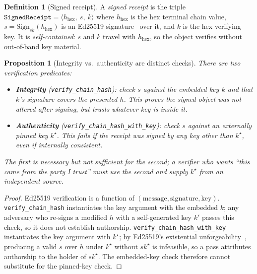 \documentclass[11pt,oneside]{book}
\theoremstyle{definition}
\newtheorem{definition}{Definition}[chapter]
\theoremstyle{plain}
\newtheorem{proposition}[theorem]{Proposition}
\theoremstyle{remark}
\newcommand{\code}[1]{\texttt{#1}}
\begin{document}
\begin{definition}[Signed receipt]\label{def:signed}
A \emph{signed receipt} is the triple
$\code{SignedReceipt}=\langle h_{\mathrm{hex}},\ s,\ k\rangle$ where $h_{\mathrm{hex}}$ is the
hex terminal chain value, $s=\mathrm{Sign}_{sk}(h_{\mathrm{hex}})$ is an Ed25519
signature~\cite{ed25519} over it, and $k$ is the hex verifying key. %
It is \emph{self-contained}:
$s$ and $k$ travel with $h_{\mathrm{hex}}$, so the object verifies without out-of-band key
material. %
\end{definition}

\begin{proposition}[Integrity vs.\ authenticity are distinct checks]\label{prop:intauth}
There are two verification predicates: %
\begin{itemize}[leftmargin=*]
\item \textbf{Integrity} (\code{verify\_chain\_hash}): check $s$ against the \emph{embedded}
key $k$ and that $k$'s signature covers the presented $h$. %
This proves the signed object was
not altered after signing, but trusts whatever key is inside it. %
\item \textbf{Authenticity} (\code{verify\_chain\_hash\_with\_key}): check $s$ against an
\emph{externally pinned} key $k^{\star}$. %
This fails if the receipt was signed by any key other
than $k^{\star}$, even if internally consistent. %
\end{itemize}
The first is necessary but not sufficient for the second; a verifier who wants ``this came from
the party I trust'' must use the second and supply $k^{\star}$ from an independent source. %
\end{proposition}

\begin{proof}
Ed25519 verification is a function of $(\text{message},\text{signature},\text{key})$. %
\code{verify\_chain\_hash} instantiates the key argument with the embedded $k$; any adversary
who re-signs a modified $h$ with a self-generated key $k'$ passes this check, so it does not
establish authorship. %
\code{verify\_chain\_hash\_with\_key} instantiates the key argument with
$k^{\star}$; by Ed25519's existential unforgeability~\cite{ed25519}, producing a valid $s$ over
$h$ under $k^{\star}$ without $sk^{\star}$ is infeasible, so a pass attributes authorship to the
holder of $sk^{\star}$. %
The embedded-key check therefore cannot substitute for the pinned-key
check. %
 \end{proof}
\end{document}

